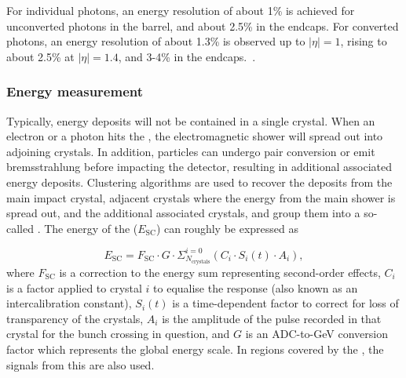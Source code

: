 For individual \Hgg photons, an energy resolution of about 1\% is achieved for unconverted photons in the barrel, and about 2.5\% in the endcaps. For converted photons, an energy resolution of about 1.3\% is observed up to $|\eta| = 1$, rising to about 2.5\% at $|\eta| = 1.4$, and  3-4\% in the endcaps.~\cite{CMS-PAS-EGM-14-001}.

\subsubsection{Energy measurement}
\label{sec:cms:ecal:energymeasurement}

Typically, energy deposits will not be contained in a single crystal. When an electron or a photon hits the \ECAL, the electromagnetic shower will spread out into adjoining crystals. In addition, particles can undergo pair conversion or emit bremsstrahlung before impacting the detector, resulting in additional associated energy deposits.
Clustering algorithms are used to recover the deposits from the main impact crystal, adjacent crystals where the energy from the main shower is spread out, and the additional associated crystals, and group them into a so-called \SC. %
The energy of the \SC ($E_{\textrm{SC}}$) can roughly be expressed as 

\begin{equation} 
\label{eq:cms:ecal:energy}
E_{\text{SC}} = F_{\text{SC}} \cdot  G  \cdot \Sigma^{i=0}_{N_\text{crystals}} ( C_{i} \cdot S_{i}(t) \cdot A_{i}) ,
\end{equation}
where $F_{\text{SC}}$ is a correction to the \SC energy sum representing second-order effects, $C_{i}$ is a factor applied to crystal $i$ to equalise the response (also known as an intercalibration constant), $S_{i}(t)$ is a time-dependent factor to correct for loss of transparency of the crystals, $A_{i}$ is the amplitude of the pulse recorded in that crystal for the bunch crossing in question, and $G$ is an ADC-to-GeV conversion factor which represents the global energy scale. In regions covered by the \ES, the signals from this \subdetector are also used.~\cite{cmsEcalCalibration}


